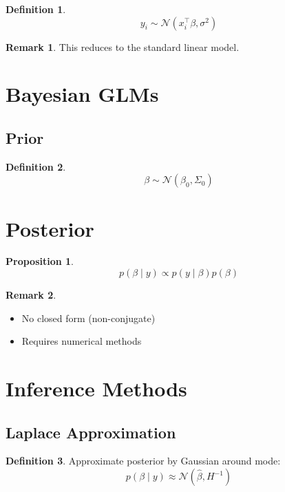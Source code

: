 \documentclass[12pt,oneside]{book}
\numberwithin{equation}{section}
\theoremstyle{definition}
\newtheorem{definition}{Definition}[section]
\newtheorem{remark}{Remark}[section]
\theoremstyle{plain}
\newtheorem{proposition}{Proposition}[section]
\theoremstyle{remark}
\newcommand{\Normal}{\mathcal{N}}
\begin{document}
\begin{definition}
$$
y_i \sim \Normal(x_i^\top \beta, \sigma^2)
$$
\end{definition}

\begin{remark}
This reduces to the standard linear model.
\end{remark}

\section{Bayesian GLMs}

\subsection{Prior}

\begin{definition}
$$
\beta \sim \Normal(\beta_0, \Sigma_0)
$$
\end{definition}

\section{Posterior}

\begin{proposition}
$$
p(\beta \mid y)
\propto
p(y \mid \beta) p(\beta)
$$
\end{proposition}

\begin{remark}
\begin{itemize}
\item No closed form (non-conjugate)
\item Requires numerical methods
\end{itemize}
\end{remark}

\section{Inference Methods}

\subsection{Laplace Approximation}

\begin{definition}
Approximate posterior by Gaussian around mode:
$$
p(\beta \mid y) \approx \Normal(\hat{\beta}, H^{-1})
$$
\end{definition}
\end{document}
